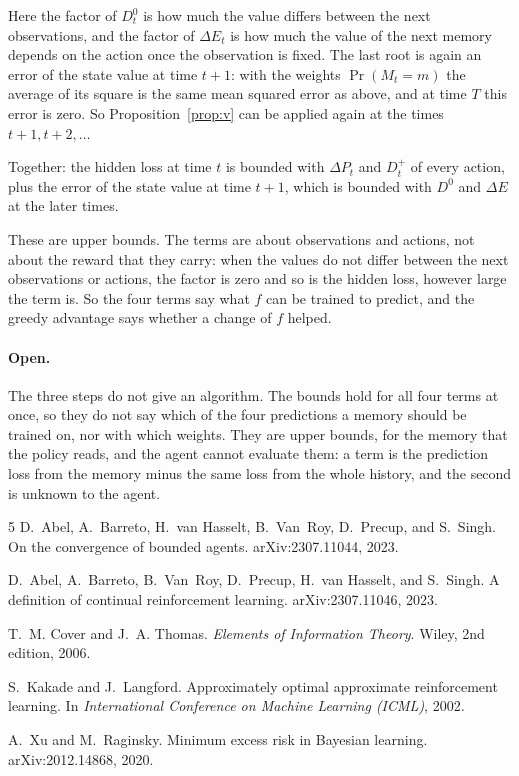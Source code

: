 \documentclass[11pt]{article}
\theoremstyle{definition}
\newcommand{\dE}{\Delta E}
\newcommand{\dP}{\Delta P}
\begin{document}
Here the factor of $D^0_t$ is how much the value differs between the next observations, and the factor of $\dE_t$ is how much the value of the next memory depends on the action once the observation is fixed. The last root is again an error of the state value at time $t+1$: with the weights $\Pr(M_t=m)$ the average of its square is the same mean squared error as above, and at time $T$ this error is zero. So Proposition~\ref{prop:v} can be applied again at the times $t+1,t+2,\dots$

Together: the hidden loss at time $t$ is bounded with $\dP_t$ and $D^+_t$ of every action, plus the error of the state value at time $t+1$, which is bounded with $D^0$ and $\dE$ at the later times.

These are upper bounds. The terms are about observations and actions, not about the reward that they carry: when the values do not differ between the next observations or actions, the factor is zero and so is the hidden loss, however large the term is. So the four terms say what $f$ can be trained to predict, and the greedy advantage says whether a change of $f$ helped.

\paragraph{Open.} The three steps do not give an algorithm. The bounds hold for all four terms at once, so they do not say which of the four predictions a memory should be trained on, nor with which weights. They are upper bounds, for the memory that the policy reads, and the agent cannot evaluate them: a term is the prediction loss from the memory minus the same loss from the whole history, and the second is unknown to the agent.

\begin{thebibliography}{5}
D.~Abel, A.~Barreto, H.~van Hasselt, B.~Van~Roy, D.~Precup, and S.~Singh.
\newblock On the convergence of bounded agents.
\newblock arXiv:2307.11044, 2023.

D.~Abel, A.~Barreto, B.~Van~Roy, D.~Precup, H.~van Hasselt, and S.~Singh.
\newblock A definition of continual reinforcement learning.
\newblock arXiv:2307.11046, 2023.

T.~M. Cover and J.~A. Thomas.
\newblock \emph{Elements of Information Theory}.
\newblock Wiley, 2nd edition, 2006.

S.~Kakade and J.~Langford.
\newblock Approximately optimal approximate reinforcement learning.
\newblock In \emph{International Conference on Machine Learning (ICML)}, 2002.

A.~Xu and M.~Raginsky.
\newblock Minimum excess risk in Bayesian learning.
\newblock arXiv:2012.14868, 2020.
\end{thebibliography}
\end{document}
